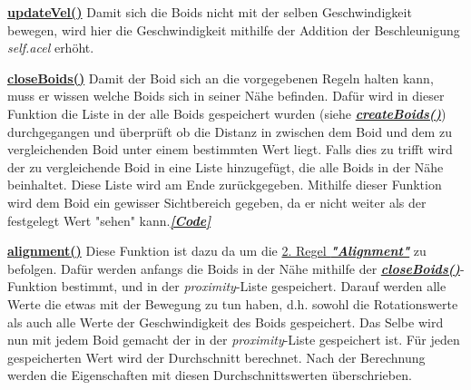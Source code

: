 \documentclass[a4paper, hidelinks, 12pt]{article}
\begin{document}
\underline{\textbf{updateVel()}}\label{sec:updateVel}
Damit sich die Boids nicht mit der selben Geschwindigkeit bewegen, wird hier die Geschwindigkeit mithilfe der Addition der Beschleunigung \emph{self.acel} erhöht.
\newline
		
\underline{\textbf{closeBoids()}}\label{sec:closeBoids}
Damit der Boid sich an die vorgegebenen Regeln halten kann, muss er wissen welche Boids sich in seiner Nähe befinden. Dafür wird in dieser Funktion die Liste in der alle Boids gespeichert wurden (siehe \hyperref[sec:createBoids]{\emph{\textbf{createBoids()}}}) durchgegangen und überprüft ob die Distanz\cite{distance} in zwischen dem Boid und dem zu vergleichenden Boid unter einem bestimmten Wert liegt. Falls dies zu trifft wird der zu vergleichende Boid in eine Liste hinzugefügt, die alle Boids in der Nähe beinhaltet. Diese Liste wird am Ende zurückgegeben. Mithilfe dieser Funktion wird dem Boid ein gewisser Sichtbereich gegeben, da er nicht weiter als der festgelegt Wert "sehen" kann.\hyperref[CodecloseBoids]{\textbf{\emph{[Code]}}}
\newline
		
\underline{\textbf{alignment()}}\label{sec:alignment}
Diese Funktion ist dazu da um die \hyperref[sec:Alignment]{2. Regel \textbf{\emph{"Alignment"}}} zu befolgen. Dafür werden anfangs die Boids in der Nähe mithilfe der \hyperref[sec:closeBoids]{\emph{\textbf{closeBoids()}}}-Funktion bestimmt, und in der \emph{proximity}-Liste gespeichert. Darauf werden alle Werte die etwas mit der Bewegung zu tun haben, d.h. sowohl die Rotationswerte als auch alle Werte der Geschwindigkeit des Boids gespeichert. Das Selbe wird nun mit jedem Boid gemacht der in der \emph{proximity}-Liste gespeichert ist. Für jeden gespeicherten Wert wird der Durchschnitt berechnet. Nach der Berechnung werden die Eigenschaften mit diesen Durchschnittswerten überschrieben.
\newline\newline
\end{document}
